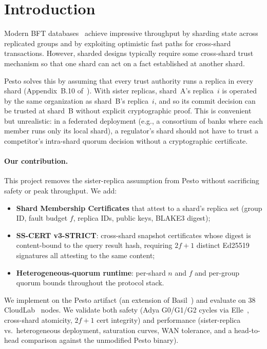 \documentclass[letterpaper,twocolumn,10pt]{article}
\begin{document}
\section{Introduction}

Modern BFT databases~\cite{basil21,pesto25} achieve impressive
throughput by sharding state across replicated groups and by exploiting
optimistic fast paths for cross-shard transactions. However, sharded
designs typically require some cross-shard trust mechanism so that one
shard can act on a fact established at another shard.

Pesto solves this by assuming that every trust authority runs a replica
in every shard (Appendix~B.10 of~\cite{pesto25}). With sister replicas,
shard~A's replica~$i$ is operated by the same organization as
shard~B's replica~$i$, and so its commit decision can be trusted at
shard~B without explicit cryptographic proof. This is convenient but
unrealistic: in a federated deployment (e.g., a consortium of banks
where each member runs only its local shard), a regulator's shard
should not have to trust a competitor's intra-shard quorum decision
without a cryptographic certificate.

\paragraph{Our contribution.} This project removes the sister-replica
assumption from Pesto without sacrificing safety or peak throughput.
We add:
\begin{itemize}\setlength{\itemsep}{2pt}
\item \textbf{Shard Membership Certificates} that attest to a shard's
      replica set (group ID, fault budget $f$, replica IDs, public
      keys, BLAKE3 digest);
\item \textbf{SS-CERT v3-STRICT}: cross-shard snapshot certificates
      whose digest is content-bound to the query result hash, requiring
      $2f{+}1$ distinct Ed25519 signatures all attesting to the same
      content;
\item \textbf{Heterogeneous-quorum runtime}: per-shard $n$ and $f$ and
      per-group quorum bounds throughout the protocol stack.
\end{itemize}

We implement on the Pesto artifact (an extension of
Basil~\cite{basil21}) and evaluate on $38$ CloudLab~\cite{cloudlab}
nodes. We validate both safety (Adya G0/G1/G2 cycles via
Elle~\cite{elle}, cross-shard atomicity, $2f{+}1$ cert integrity) and
performance (sister-replica vs.\ heterogeneous deployment, saturation
curves, WAN tolerance, and a head-to-head comparison against the
unmodified Pesto binary).
\end{document}
